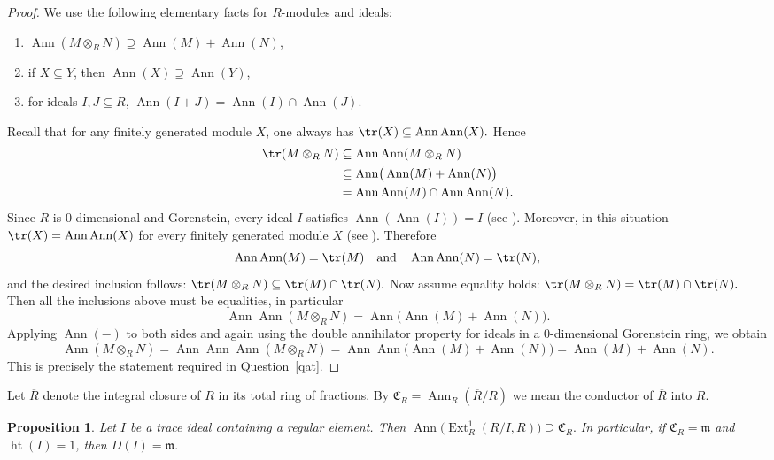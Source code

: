 \documentclass[11pt,a4paper]{amsart}
\numberwithin{equation}{section}
\newtheorem{proposition}[theorem]{Proposition}
\DeclareMathOperator{\Ann}{Ann}\DeclareMathOperator{\ann}{Ann}
\DeclareMathOperator{\Ht}{ht}
\DeclareMathOperator{\Ext}{Ext}
\begin{document}
\begin{proof}
	We use the following elementary facts for $R$-modules and ideals:
	\begin{enumerate}
		\item $\Ann(M \otimes_R N) \supseteq \Ann(M) + \Ann(N)$,
		\item if $X \subseteq Y$, then $\Ann(X) \supseteq \Ann(Y)$,
		\item for ideals $I,J \subseteq R$, $\Ann(I+J) = \Ann(I) \cap \Ann(J)$.
	\end{enumerate}
	
	Recall that for any finitely generated module $X$, one always has
	\(
	\tr(X) \subseteq \Ann\Ann(X).
	\)
	Hence
	\[
	\begin{aligned}
	\tr(M \otimes_R N)
	&\subseteq \Ann\Ann(M \otimes_R N) \\
	&\subseteq \Ann\!\big(\Ann(M) + \Ann(N)\big) \\
	&= \Ann\Ann(M) \cap \Ann\Ann(N).
	\end{aligned}
	\]
	Since $R$ is $0$-dimensional and Gorenstein, every ideal $I$ satisfies $\Ann(\Ann(I))=I$ (see \cite[Ex.~3.2.15]{BH}). Moreover, in this situation $\tr(X)=\Ann\Ann(X)$ for every finitely generated module $X$ (see \cite{lindo2}). Therefore
	\[
	\Ann\Ann(M)=\tr(M)
	\quad\text{and}\quad
	\Ann\Ann(N)=\tr(N),
	\]
	and the desired inclusion follows:
	\(
	\tr(M \otimes_R N) \subseteq \tr(M) \cap \tr(N).
	\)
	Now assume equality holds:
$\tr(M \otimes_R N)=\tr(M)\cap\tr(N).
$
	Then all the inclusions above must be equalities, in particular
	\[
	\Ann\Ann(M \otimes_R N)=\Ann\!\big(\Ann(M)+\Ann(N)\big).
	\]
	Applying $\Ann(-)$ to both sides and again using the double annihilator property for ideals in a $0$-dimensional Gorenstein ring, we obtain
	\[
	\Ann(M \otimes_R N)
	=\Ann\Ann\Ann(M \otimes_R N)
	=\Ann\Ann\!\big(\Ann(M)+\Ann(N)\big)
	=\Ann(M)+\Ann(N).
	\]
	This is precisely the statement required in Question~\ref{qat}.
\end{proof}
Let $\overline{R}$ denote the integral closure of $R$ in its total ring of fractions.
By $\mathfrak{C}_R= \Ann_R(\overline{R}/R)$ we mean the conductor of $\overline{R}$ into $R$.

\begin{proposition}\label{cl}
	Let $I$ be a trace ideal containing a regular element. Then
	\(
	\Ann\!\big(\Ext^1_R(R/I, R)\big) \supseteq \mathfrak{C}_R.
	\)
	In particular, if $\mathfrak{C}_R=\mathfrak{m}$ and $\Ht(I)=1$, then
	\(
	D(I)=\mathfrak{m}.
	\)
\end{proposition}
\end{document}
